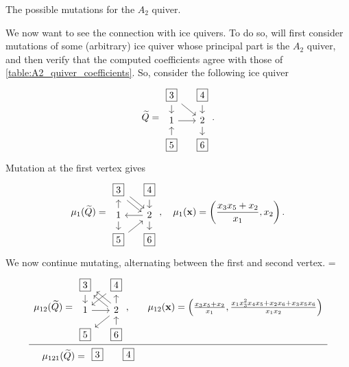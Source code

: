 \begin{example}
\begin{table}[ht!]
		\caption{The possible mutations for the $A_2$ quiver.}
		\label{table:A2_quiver_coefficients}
	\end{table}

	We now want to see the connection with ice quivers. To do so, will first consider mutations of some (arbitrary) ice quiver whose principal part is the $A_2$ quiver, and then verify that the computed coefficients agree with those of \cref{table:A2_quiver_coefficients}. So, consider the following ice quiver
	\begin{equation*}
		\tQ = \begin{tikzcd}[sep=small]
			\boxed{3} \dar \drar & \boxed{4} \dar \\
			1 \rar & 2 \dar \\
			\boxed{5} \uar & \boxed{6}
		\end{tikzcd}.
	\end{equation*}
	Mutation at the first vertex gives
	\begin{equation*}
		\mu_1(\tQ) = \begin{tikzcd}[sep=small]
			\boxed{3} \ar[dr, shift left] \ar[dr, shift right] & \boxed{4} \dar \\
			1 \uar \dar & 2 \lar \dar \\
			\boxed{5} \urar & \boxed{6}
		\end{tikzcd},\quad
		\mu_1(\bx) = \left(\frac{x_3x_5 + x_2}{x_1}, x_2\right).
	\end{equation*}
	We now continue mutating, alternating between the first and second vertex.
		{
			\everymath={\displaystyle}
			\begin{equation*}
				\begin{array}{rc}
					\mu_{12}(\tQ) = \begin{tikzcd}[sep=small, ampersand replacement=\&]
						                \boxed{3} \dar \ar[dr, shift left, leftarrow] \ar[dr, shift right, leftarrow] \& \boxed{4} \dlar \\
						                1  \rar \& 2 \uar \dlar  \\
						                \boxed{5} \& \boxed{6} \uar
					                \end{tikzcd},\quad &
					\mu_{12}(\bx) = \left(\frac{x_3x_5 + x_2}{x_1}, \frac{x_{1} x_{3}^{2} x_{4} x_{5} + x_{2} x_{6} + x_{3} x_{5} x_{6}}{x_{1} x_{2}}\right)                 \\
					\hline
					\mu_{121}(\tQ) = \begin{tikzcd}[sep=small, ampersand replacement=\&]
						                 \boxed{3}  \& \boxed{4}  \\

\end{tikzcd}
\end{array}
\end{equation*}}
\end{example}
